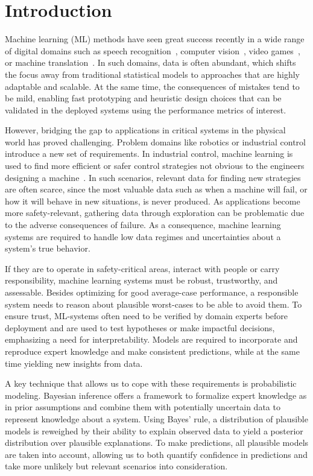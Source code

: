 \chapter{Introduction}
\label{toc:introduction}
Machine learning (ML) methods have seen great success recently in a wide range of digital domains such as speech recognition~\parencite{chorowski_attention-based_2015}, computer vision~\parencite{russakovsky_imagenet_2015}, video games~\parencite{berner_dota_2019}, or machine translation~\parencite{johnson_googles_2017}.
In such domains, data is often abundant, which shifts the focus away from traditional statistical models to approaches that are highly adaptable and scalable.
At the same time, the consequences of mistakes tend to be mild, enabling fast prototyping and heuristic design choices that can be validated in the deployed systems using the performance metrics of interest.

However, bridging the gap to applications in critical systems in the physical world has proved challenging.
Problem domains like robotics or industrial control introduce a new set of requirements.
In industrial control, machine learning is used to find more efficient or safer control strategies not obvious to the engineers designing a machine~\parencite{hein_benchmark_2017}.
In such scenarios, relevant data for finding new strategies are often scarce, since the most valuable data such as when a machine will fail, or how it will behave in new situations, is never produced.
As applications become more safety-relevant, gathering data through exploration can be problematic due to the adverse consequences of failure.
As a consequence, machine learning systems are required to handle low data regimes and uncertainties about a system's true behavior.

If they are to operate in safety-critical areas, interact with people or carry responsibility, machine learning systems must be robust, trustworthy, and assessable.
Besides optimizing for good average-case performance, a responsible system needs to reason about plausible worst-cases to be able to avoid them.
To ensure trust, ML-systems often need to be verified by domain experts before deployment and are used to test hypotheses or make impactful decisions, emphasizing a need for interpretability.
Models are required to incorporate and reproduce expert knowledge and make consistent predictions, while at the same time yielding new insights from data.

A key technique that allows us to cope with these requirements is probabilistic modeling.
Bayesian inference offers a framework to formalize expert knowledge as in prior assumptions and combine them with potentially uncertain data to represent knowledge about a system.
Using Bayes' rule, a distribution of plausible models is reweighed by their ability to explain observed data to yield a posterior distribution over plausible explanations.
To make predictions, all plausible models are taken into account, allowing us to both quantify confidence in predictions and take more unlikely but relevant scenarios into consideration.

